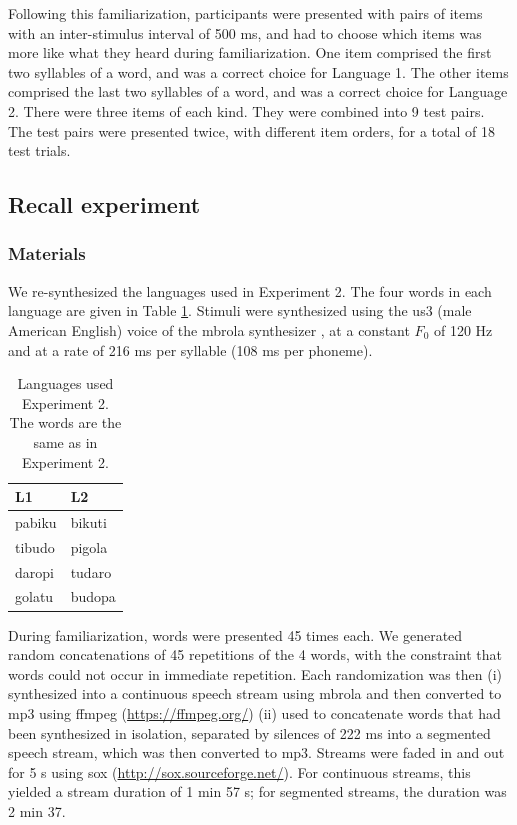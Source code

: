 \documentclass[]{article}
\begin{document}
Following this familiarization, participants were presented with pairs of items with an inter-stimulus interval of 500 ms, and had to choose which items was more like what they heard during familiarization. One item comprised the first two syllables of a word, and was a correct choice for Language 1. The other items comprised the last two syllables of a word, and was a correct choice for Language 2. There were three items of each kind. They were combined into 9 test pairs. The test pairs were presented twice, with different item orders, for a total of 18 test trials.

\subsection{Recall experiment}\label{recall-experiment}

\subsubsection{Materials}\label{materials}

We re-synthesized the languages used in \citet{Saffran-Science} Experiment 2. The four words in each language are given in Table \ref{tab:recall-languages}. Stimuli were synthesized using the us3 (male American English) voice of the mbrola synthesizer \citep{mbrola}, at a constant \(F_0\) of 120 Hz and at a rate of 216 ms per syllable (108 ms per phoneme).

\begin{table}[hbp]

\caption{\label{tab:recall-print-languages}\label{tab:recall-languages}Languages used Experiment 2. The words are the same as in \cite{Saffran-Science} Experiment 2.}
\centering
\begin{tabular}[t]{ll}
\toprule
L1 & L2\\
\midrule
pabiku & bikuti\\
tibudo & pigola\\
daropi & tudaro\\
golatu & budopa\\
\bottomrule
\end{tabular}
\end{table}

During familiarization, words were presented 45 times each. We generated random concatenations of 45 repetitions of the 4 words, with the constraint that words could not occur in immediate repetition. Each randomization was then (i) synthesized into a continuous speech stream using mbrola and then converted to mp3 using ffmpeg (\url{https://ffmpeg.org/}) (ii) used to concatenate words that had been synthesized in isolation, separated by silences of 222 ms into a segmented speech stream, which was then converted to mp3. Streams were faded in and out for 5 s using sox (\url{http://sox.sourceforge.net/}). For continuous streams, this yielded a stream duration of 1 min 57 s; for segmented streams, the duration was 2 min 37.
\end{document}
